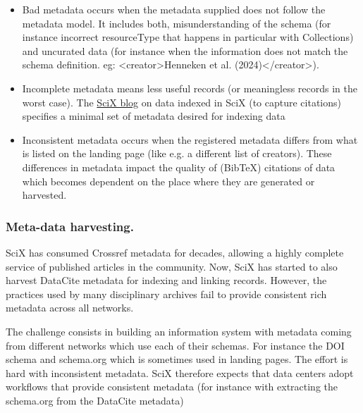 \documentclass[11pt,a4paper]{ivoa}
\begin{document}
\begin{itemize}
\item{} Bad metadata occurs when the metadata supplied does not follow the metadata model.\newline
It includes both, misunderstanding of the schema (for instance incorrect resourceType that happens in particular with Collections) and uncurated data (for instance when the information does not match the schema definition. eg: \textless{}creator\textgreater{}Henneken et al. (2024)\textless{}/creator\textgreater{}).

\item{} Incomplete metadata means  less useful records (or meaningless records in the worst case). The \href{https://scixplorer.org/scixblog/data-linking-I}{SciX blog} on data indexed in SciX (to capture citations) specifies a minimal set of metadata desired for indexing data

\item{} Inconsistent metadata occurs when the registered metadata differs from what is listed on the landing page (like e.g. a different list of creators). These differences in metadata impact the quality of (BibTeX) citations of data which becomes dependent on the place where they are generated or harvested.
\end{itemize}

\subsubsection{Meta-data harvesting.}\hypertarget{meta-data-harvesting}{}\label{sec:meta-data-harvesting}

SciX has consumed Crossref metadata for decades, allowing a highly complete service of published articles in the community. Now, SciX has started to also harvest DataCite metadata for indexing and linking records.  However, the practices used by many disciplinary archives fail to provide consistent rich metadata across all networks.

The challenge consists in building an information system with metadata coming from different networks which use each of their schemas. For instance the DOI schema and schema.org which is sometimes used in landing pages. The effort is hard with inconsistent metadata.  SciX therefore expects that data centers adopt workflows that provide consistent metadata (for instance with extracting the schema.org from\newline
the DataCite metadata)
\end{document}

